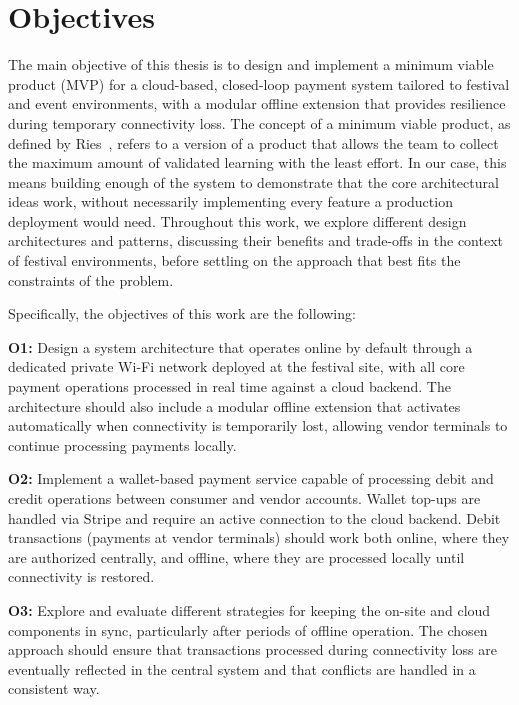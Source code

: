 \section{Objectives}
\label{sec:objectives}

The main objective of this thesis is to design and implement a minimum viable product (MVP) for a cloud-based, closed-loop payment system tailored to festival and event environments, with a modular offline extension that provides resilience during temporary connectivity loss. The concept of a minimum viable product, as defined by Ries~\cite{Ries2011}, refers to a version of a product that allows the team to collect the maximum amount of validated learning with the least effort. In our case, this means building enough of the system to demonstrate that the core architectural ideas work, without necessarily implementing every feature a production deployment would need. Throughout this work, we explore different design architectures and patterns, discussing their benefits and trade-offs in the context of festival environments, before settling on the approach that best fits the constraints of the problem.

Specifically, the objectives of this work are the following:

\textbf{O1:} Design a system architecture that operates online by default through a dedicated private Wi-Fi network deployed at the festival site, with all core payment operations processed in real time against a cloud backend. The architecture should also include a modular offline extension that activates automatically when connectivity is temporarily lost, allowing vendor terminals to continue processing payments locally.

\textbf{O2:} Implement a wallet-based payment service capable of processing debit and credit operations between consumer and vendor accounts. Wallet top-ups are handled via Stripe and require an active connection to the cloud backend. Debit transactions (payments at vendor terminals) should work both online, where they are authorized centrally, and offline, where they are processed locally until connectivity is restored.

\textbf{O3:} Explore and evaluate different strategies for keeping the on-site and cloud components in sync, particularly after periods of offline operation. The chosen approach should ensure that transactions processed during connectivity loss are eventually reflected in the central system and that conflicts are handled in a consistent way.

